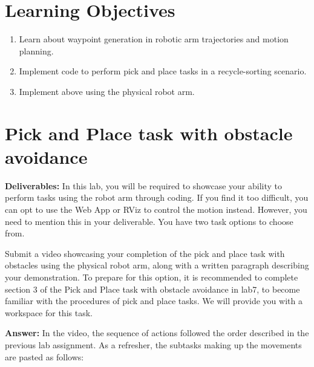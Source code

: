 \documentclass[12pt]{article}
\begin{document}
	\MakeScribeTop


\section{Learning Objectives}
\begin{enumerate}
    \item Learn about waypoint generation in robotic arm trajectories and motion planning.
    
    \item Implement code to perform pick and place tasks in a recycle-sorting scenario.
    
    \item Implement above using the physical robot arm. 
    
\end{enumerate}


\section{Pick and Place task with obstacle avoidance}
\textbf{Deliverables:}
In this lab, you will be required to showcase your ability to perform tasks using the robot arm through coding. If you find it too difficult, you can opt to use the Web App or RViz to control the motion instead. However, you need to mention this in your deliverable. You have two task options to choose from.
    
Submit a video showcasing your completion of the pick and place task with obstacles using the physical robot arm, along with a written paragraph describing your demonstration. To prepare for this option, it is recommended to complete section 3 of the Pick and Place task with obstacle avoidance in lab7, to become familiar with the procedures of pick and place tasks. We will provide you with a workspace for this task.

\textbf{Answer: }In the video, the sequence of actions followed the order described in the previous lab assignment. As a refresher, the subtasks making up the movements are pasted as follows:
\end{document}
